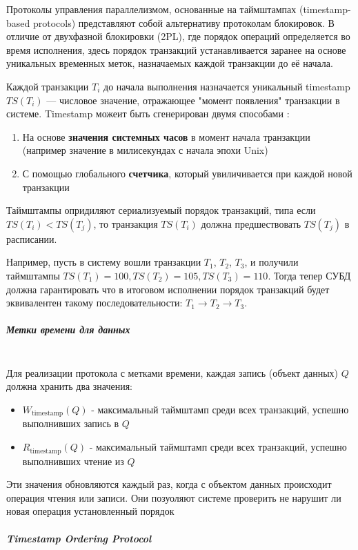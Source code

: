 Протоколы управления параллелизмом, основанные на таймштампах (timestamp-based protocols) представляют собой альтернативу протоколам блокировок. В отличие от двухфазной блокировки (2PL), где порядок операций определяется во время исполнения, здесь порядок транзакций устанавливается заранее на основе уникальных временных меток, назначаемых каждой транзакции до её начала.

Каждой транзакции $T_i$ до начала выполнения назначается уникальный timestamp $TS(T_i)$ — числовое значение, отражающее "момент появления" транзакции в системе. Timestamp можеит быть сгенерирован двумя способами \autocite[ch.18 §5]{Silberschatz}:
\begin{enumerate}
    \item На основе \textbf{значения системных часов} в момент начала транзакции (например значение в милисекундах с начала эпохи Unix)
    \item С помощью глобального \textbf{счетчика}, который увиличивается при каждой новой транзакции 
\end{enumerate}

Таймштампы опридиляют сериализуемый порядок транзакций, типа если $TS(T_i) < TS(T_j)$, то транзакция $TS(T_i)$ должна предшествовать $TS(T_j)$ в расписании.

Например, пусть в систему вошли транзакции $T_1$, $T_2$, $T_3$, и получили таймштампы $TS(T_1) = 100, TS(T_2) = 105, TS(T_3) = 110$. Тогда тепер СУБД должна гарантировать что в итоговом исполнении порядок транзакций будет эквивалентен такому последовательности: $T_1 \rightarrow T_2 \rightarrow T_3$.

\subparagraph{Метки времени для данных} ~\\
Для реализации протокола с метками времени, каждая запись (объект данных) $Q$ должна хранить два значения:

\begin{itemize}
    \item $W_{\text{timestamp}}(Q)$ - максимальный таймштамп среди всех транзакций, успешно выполнивших запись в $Q$
    \item $R_{\text{timestamp}}(Q)$ - максимальный таймштамп среди всех транзакций, успешно выполнивших чтение из $Q$
\end{itemize}


Эти значения обновляются каждый раз, когда с объектом данных происходит операция чтения или записи. Они позуоляют системе проверить не нарушит ли новая операция установленный порядок

\subparagraph{Timestamp Ordering Protocol} ~\\

